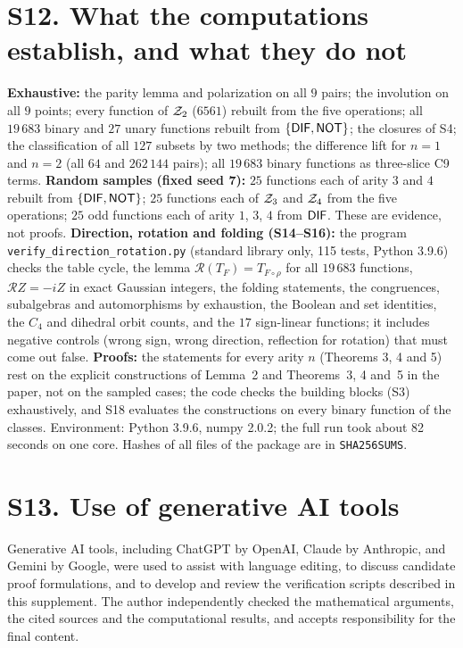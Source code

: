 \documentclass[10pt,a4paper]{article}
\begin{document}
\section*{S12. What the computations establish, and what they do not}
\textbf{Exhaustive:} the parity lemma and polarization on all $9$ pairs; the involution on all $9$ points; every function of $\mathcal Z_2$ ($6561$) rebuilt from the five operations; all $19\,683$ binary and $27$ unary functions rebuilt from $\{\mathsf{DIF},\mathsf{NOT}\}$; the closures of S4; the classification of all $127$ subsets by two methods; the difference lift for $n=1$ and $n=2$ (all $64$ and $262\,144$ pairs); all $19\,683$ binary functions as three-slice C9 terms.
\textbf{Random samples (fixed seed 7):} $25$ functions each of arity $3$ and $4$ rebuilt from $\{\mathsf{DIF},\mathsf{NOT}\}$; $25$ functions each of $\mathcal Z_3$ and $\mathcal Z_4$ from the five operations; $25$ odd functions each of arity $1$, $3$, $4$ from $\mathsf{DIF}$. These are evidence, not proofs.
\textbf{Direction, rotation and folding (S14--S16):} the program \texttt{verify\_direction\_rotation.py} (standard library only, 115 tests, Python 3.9.6) checks the table cycle, the lemma $\mathcal R(T_F)=T_{F\circ\rho}$ for all $19\,683$ functions, $\mathcal RZ=-iZ$ in exact Gaussian integers, the folding statements, the congruences, subalgebras and automorphisms by exhaustion, the Boolean and set identities, the $C_4$ and dihedral orbit counts, and the $17$ sign-linear functions; it includes negative controls (wrong sign, wrong direction, reflection for rotation) that must come out false.
\textbf{Proofs:} the statements for every arity $n$ (Theorems 3, 4 and 5) rest on the explicit constructions of Lemma~2 and Theorems~3, 4 and~5 in the paper, not on the sampled cases; the code checks the building blocks (S3) exhaustively, and S18 evaluates the constructions on every binary function of the classes.
Environment: Python 3.9.6, numpy 2.0.2; the full run took about 82 seconds on one core. Hashes of all files of the package are in \texttt{SHA256SUMS}.

\section*{S13. Use of generative AI tools}
Generative AI tools, including ChatGPT by OpenAI, Claude by Anthropic, and Gemini by Google, were used to assist with language editing, to discuss candidate proof formulations, and to develop and review the verification scripts described in this supplement. The author independently checked the mathematical arguments, the cited sources and the computational results, and accepts responsibility for the final content.
\end{document}
